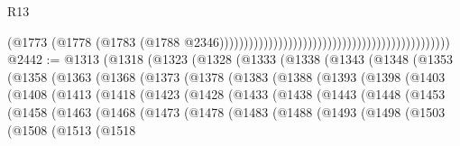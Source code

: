 \begin{lexlean}{R13}
\begin{coremodule}
                                                                                          (@1773
                                                                                            (@1778
                                                                                              (@1783
                                                                                                (@1788
                                                                                                  @2346)))))))))))))))))))))))))))))))))))))))))))))))
@2442 := @1313
    (@1318
      (@1323
        (@1328
          (@1333
            (@1338
              (@1343
                (@1348
                  (@1353
                    (@1358
                      (@1363
                        (@1368
                          (@1373
                            (@1378
                              (@1383
                                (@1388
                                  (@1393
                                    (@1398
                                      (@1403
                                        (@1408
                                          (@1413
                                            (@1418
                                              (@1423
                                                (@1428
                                                  (@1433
                                                    (@1438
                                                      (@1443
                                                        (@1448
                                                          (@1453
                                                            (@1458
                                                              (@1463
                                                                (@1468
                                                                  (@1473
                                                                    (@1478
                                                                      (@1483
                                                                        (@1488
                                                                          (@1493
                                                                            (@1498
                                                                              (@1503
                                                                                (@1508
                                                                                  (@1513
                                                                                    (@1518

\end{coremodule}
\end{lexlean}

